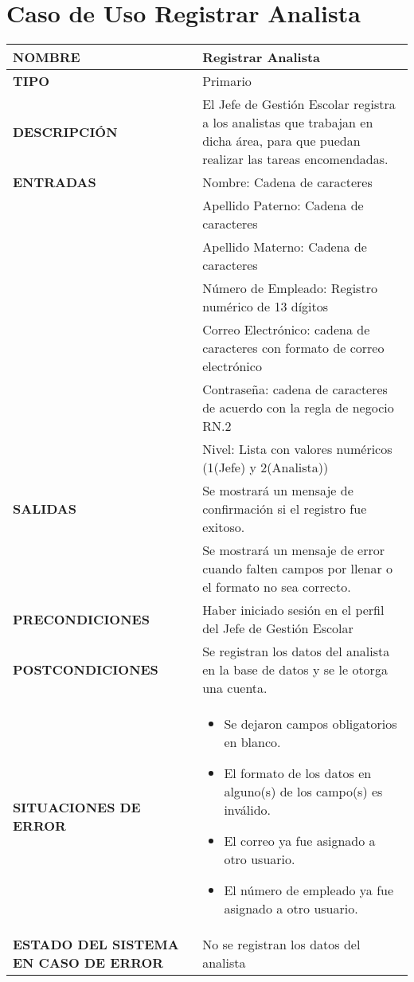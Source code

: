 \newpage
\section{Caso de Uso Registrar Analista}
\begin{longtable}{ | p{6cm} | p{10cm} |}
\hline
\textbf{NOMBRE} & Registrar Analista\\
\hline
\textbf{TIPO} & Primario\\
\hline
\textbf{DESCRIPCIÓN} & El Jefe de Gestión Escolar registra a los analistas que trabajan en dicha área, para que puedan realizar las tareas encomendadas.\\
\hline
\textbf{ENTRADAS} & Nombre: Cadena de caracteres\\ & Apellido Paterno: Cadena de caracteres \\  & Apellido Materno: Cadena de caracteres\\ & Número de Empleado: Registro numérico de 13 dígitos\\ & Correo Electrónico: cadena de caracteres con formato de correo electrónico\\ & Contraseña: cadena de caracteres de acuerdo con la regla de negocio RN.2\\ & Nivel: Lista con valores numéricos (1(Jefe) y 2(Analista))\\
\hline
\textbf{SALIDAS} & Se mostrará un mensaje de confirmación si el registro fue exitoso.\\& Se mostrará un mensaje de error cuando falten campos por llenar o el formato no sea correcto.\\
\hline
\textbf{PRECONDICIONES} & Haber iniciado sesión en el perfil del Jefe de Gestión Escolar\\
\hline
\textbf{POSTCONDICIONES} & Se registran los datos del analista en la base de datos y se le otorga una cuenta.\\
\hline
\textbf{SITUACIONES DE ERROR} & \begin{itemize}
    \item Se dejaron campos obligatorios en blanco.
    \item El formato de los datos en alguno(s) de los campo(s) es inválido.
    \item El correo ya fue asignado a otro usuario.
    \item El número de empleado ya fue asignado a otro usuario.
\end{itemize}\\
\hline
\textbf{ESTADO DEL SISTEMA EN CASO DE ERROR} & No se registran los datos del analista\\

\end{longtable}
